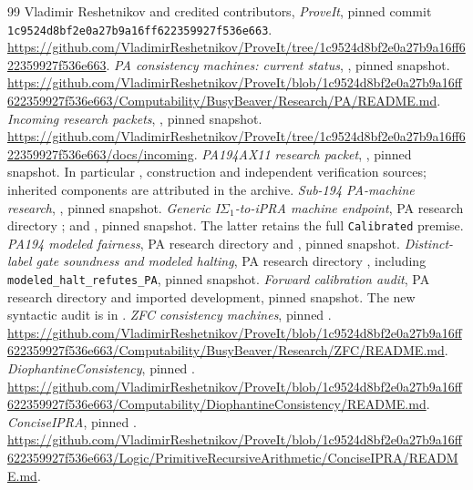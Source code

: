 \documentclass[11pt,a4paper]{article}
\newcommand{\commit}{\texttt{1c9524d8bf2e0a27b9a16ff622359927f536e663}}
\begin{document}
\clearpage
\begin{thebibliography}{99}
 Vladimir Reshetnikov and credited contributors,
\emph{ProveIt}, pinned commit \commit.
\url{https://github.com/VladimirReshetnikov/ProveIt/tree/1c9524d8bf2e0a27b9a16ff622359927f536e663}.
 \emph{PA consistency machines: current status},
, pinned snapshot.
\url{https://github.com/VladimirReshetnikov/ProveIt/blob/1c9524d8bf2e0a27b9a16ff622359927f536e663/Computability/BusyBeaver/Research/PA/README.md}.
 \emph{Incoming research packets},
, pinned snapshot.
\url{https://github.com/VladimirReshetnikov/ProveIt/tree/1c9524d8bf2e0a27b9a16ff622359927f536e663/docs/incoming}.
 \emph{PA194AX11 research packet},
, pinned snapshot.
In particular , construction and independent
verification sources; inherited components are attributed in the archive.
 \emph{Sub-194 PA-machine research},
, pinned snapshot.
 \emph{Generic I$\Sigma_1$-to-iPRA machine endpoint},
PA research directory ;
 and ,
pinned snapshot. The latter retains the full \texttt{Calibrated} premise.
 \emph{PA194 modeled fairness}, PA research
directory  and
, pinned snapshot.
 \emph{Distinct-label gate soundness and modeled
halting}, PA research directory ,
including \texttt{modeled\_halt\_refutes\_PA}, pinned snapshot.
 \emph{Forward calibration audit}, PA research
directory  and imported
 development,
pinned snapshot. The new syntactic audit is in
.
 \emph{ZFC consistency machines}, pinned
.
\url{https://github.com/VladimirReshetnikov/ProveIt/blob/1c9524d8bf2e0a27b9a16ff622359927f536e663/Computability/BusyBeaver/Research/ZFC/README.md}.
 \emph{DiophantineConsistency}, pinned
.
\url{https://github.com/VladimirReshetnikov/ProveIt/blob/1c9524d8bf2e0a27b9a16ff622359927f536e663/Computability/DiophantineConsistency/README.md}.
 \emph{ConciseIPRA}, pinned
.
\url{https://github.com/VladimirReshetnikov/ProveIt/blob/1c9524d8bf2e0a27b9a16ff622359927f536e663/Logic/PrimitiveRecursiveArithmetic/ConciseIPRA/README.md}.
\end{thebibliography}
\end{document}
